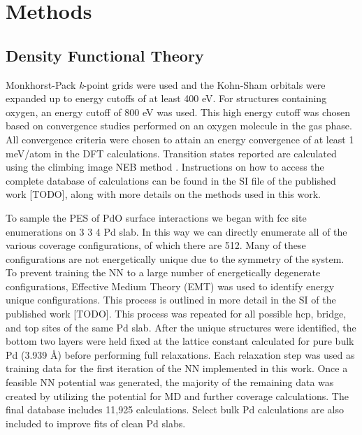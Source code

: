 \documentclass[12pt]{cmuthesis}
\begin{document}
\section{Methods}
\label{sec:orgd3a6d67}
\subsection{Density Functional Theory}
\label{sec:orgd798e80}
Monkhorst-Pack \emph{k}-point grids \cite{monkhorst-1976-special-point} were used  and the Kohn-Sham orbitals were expanded up to energy cutoffs of at least 400 eV. For structures containing oxygen, an energy cutoff of 800 eV was used. This high energy cutoff was chosen based on convergence studies performed on an oxygen molecule in the gas phase. All convergence criteria were chosen to attain an energy convergence of at least 1 meV/atom in the DFT calculations. Transition states reported are calculated using the climbing image NEB method \cite{henkelman-2000}. Instructions on how to access the complete database of calculations can be found in the SI file of the published work [TODO], along with more details on the methods used in this work.

To sample the PES of PdO surface interactions we began with fcc site enumerations on 3 \texttimes{} 3 \texttimes{} 4 Pd slab. In this way we can directly enumerate all of the various coverage configurations, of which there are 512. Many of these configurations are not energetically unique due to the symmetry of the system. To prevent training the NN to a large number of energetically degenerate configurations, Effective Medium Theory (EMT) \cite{jacobsen-1996-semi-empir} was used to identify energy unique configurations. This process is outlined in more detail in the SI of the published work [TODO]. This process was repeated for all possible hcp, bridge, and top sites of the same Pd slab. After the unique structures were identified, the bottom two layers were held fixed at the lattice constant calculated for pure bulk Pd (3.939 \AA{}) before performing full relaxations. Each relaxation step was used as training data for the first iteration of the NN implemented in this work. Once a feasible NN potential was generated, the majority of the remaining data was created by utilizing the potential for MD and further coverage calculations. The final database includes 11,925 calculations. Select bulk Pd calculations are also included to improve fits of clean Pd slabs.
\end{document}
